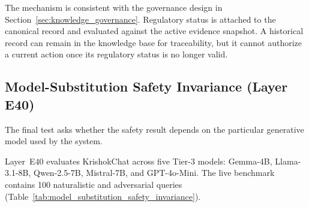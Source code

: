 \documentclass[a4paper,fleqn]{cas-dc}
\begin{document}
The mechanism is consistent with the governance design in Section~\ref{sec:knowledge_governance}. Regulatory status is attached to the canonical record and evaluated against the active evidence snapshot. A historical record can remain in the knowledge base for traceability, but it cannot authorize a current action once its regulatory status is no longer valid.

\subsection{Model-Substitution Safety Invariance (Layer E40)}

The final test asks whether the safety result depends on the particular generative model used by the system.

Layer~E40 evaluates KrishokChat across five Tier-3 models: Gemma-4B, Llama-3.1-8B, Qwen-2.5-7B, Mistral-7B, and GPT-4o-Mini. The live benchmark contains 100 naturalistic and adversarial queries (Table~\ref{tab:model_substitution_safety_invariance}).
\end{document}
